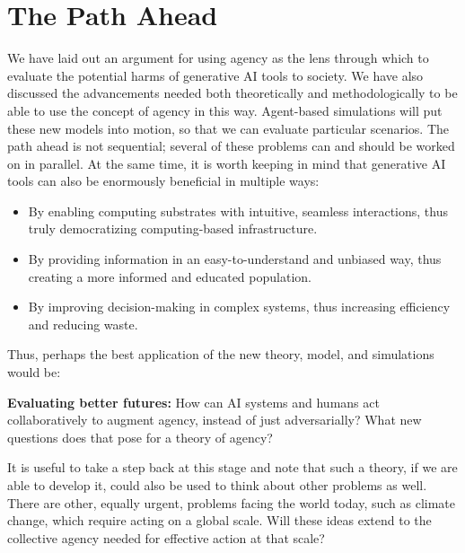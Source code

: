 \section{The Path Ahead}
\label{sec:path}

We have laid out an argument for using agency as the lens through which to evaluate the potential harms of generative AI tools to society. We
have also discussed the advancements needed both theoretically and methodologically to be able to use the concept of agency in this way.
Agent-based simulations will put these new models into motion, so that we can evaluate particular scenarios. The path ahead is not sequential;
several of these problems can and should be worked on in parallel.
At the same time, it is worth keeping in mind that
generative AI tools can also be enormously beneficial in multiple ways:

\begin{itemize}
    \item By enabling computing substrates with intuitive, seamless interactions, thus truly democratizing computing-based infrastructure.
    \item By providing information in an easy-to-understand and unbiased way, thus creating a more informed and educated population.
    \item By improving decision-making in complex systems, thus increasing efficiency and reducing waste.
\end{itemize}

Thus, perhaps the best application of the new theory, model, and simulations would be:

\smallskip
\noindent
\textbf{Evaluating better futures:} How can AI systems and humans act collaboratively to augment agency, instead of just adversarially? What new
questions does that pose for a theory of agency?

It is useful to take a step back at this stage and note that such a theory, if we are able to develop it, could also be used to think about
other problems as well. There are other, equally urgent, problems facing the world today, such as climate change, which require acting on a
global scale. Will these ideas extend to the collective agency needed for effective action at that scale?